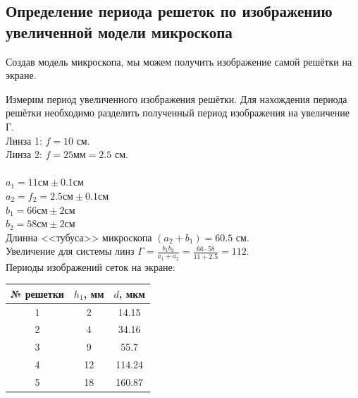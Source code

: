 \documentclass[a4paper, 12pt]{article}
\begin{document}
	\subsection{Определение периода решеток по изображению увеличенной модели микроскопа}
	Создав модель микроскопа, мы можем получить изображение самой решётки на экране.\par
	Измерим период увеличенного изображения решётки. Для нахождения периода решётки необходимо разделить полученный период изображения на увеличение Г.
\\
	Линза 1: $f=10$ см.\\
	Линза 2: $f=25\text{мм}=2.5$ см.\\
	\\
	$a_1=11 \text{см}\pm 0.1 \text{см}$\\
	$a_2=f_2=2.5\text{см}\pm 0.1\text{см}$\\
	$b_1=66\text{см}\pm 2\text{см}$\\
	$b_2=58\text{см}\pm 2\text{см}$\\
	Длинна <<тубуса>> микроскопа $(a_2+b_1)=60.5$ см.\\
	Увеличение для системы линз $\Gamma=\frac{b_1b_2}{a_1+a_2}=\frac{66\cdot58}{11+2.5}=112$.\\
	Периоды изображений сеток на экране:
	\begin{table}[h]
		\centering
		\begin{tabular}{|c|c|c|}
			\hline
			№ решетки & $h_1$, мм & $d$, мкм\\
			\hline
			1 & 2 & 14.15\\
			2 & 4 & 34.16\\
			3 & 9 & 55.7\\
			4 & 12 & 114.24\\
			5 & 18 & 160.87\\
			\hline
		\end{tabular}
	\end{table}
\end{document}
